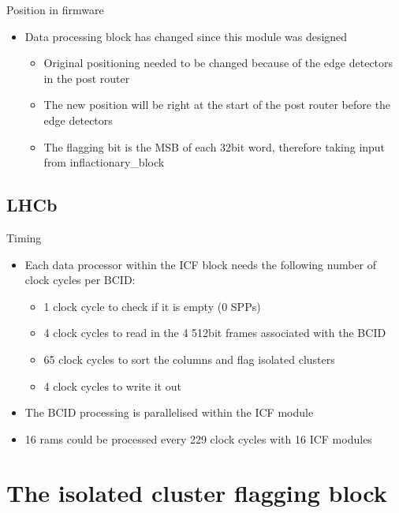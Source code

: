 \documentclass{beamer}
\begin{document}
\begin{frame}{Position in firmware}
  \begin{itemize}
    \item
      Data processing block has changed since this module was designed
      \begin{itemize}
        \item
          Original positioning needed to be changed because of the edge detectors in the post router
        \item
          The new position will be right at the start of the post router before the edge detectors
        \item
          The flagging bit is the MSB of each 32bit word, therefore taking input from inflactionary\_block
      \end{itemize}
    \end{itemize}
\end{frame}

\subsection{LHCb}
\begin{frame}{Timing}
  \begin{itemize}
    \item
      Each data processor within the ICF block needs the following number of clock cycles per BCID:
      \begin{itemize}
        \item
            1 clock cycle to check if it is empty (0 SPPs)
        \item
            4 clock cycles to read in the 4 512bit frames associated with the BCID
        \item
            65 clock cycles to sort the columns and flag isolated clusters
        \item
            4 clock cycles to write it out
      \end{itemize}
    \item
      The BCID processing is parallelised within the ICF module
    \item
      16 rams could be processed every 229 clock cycles with 16 ICF modules
  \end{itemize}
\end{frame}



\section{The isolated cluster flagging block}
\end{document}

